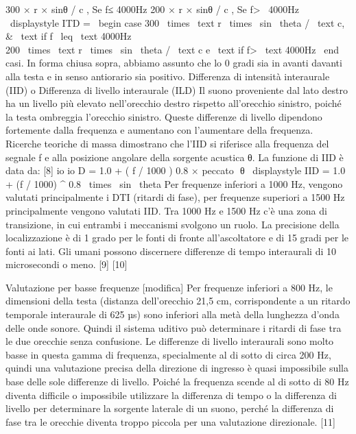 {
300 ×
r
× sin⁡θ
/
c
,
Se
f≤
4000Hz
200 ×
r
× sin⁡θ
/
c
,
Se
f>
 4000Hz
 
{\ displaystyle ITD = {\ begin {case} 300 \ times {\ text {r}} \ times \ sin \ theta / {\ text {c}}, & {\ text {if}} f \ leq {\ text {4000Hz}} \\ 200 \ times {\ text {r}} \ times \ sin \ theta / {\ text {c}} e {\ text {if}} f> {\ text {4000Hz}} \ end {casi}}}. In forma chiusa sopra, abbiamo assunto che lo 0 gradi sia in avanti davanti alla testa e in senso antiorario sia positivo.
Differenza di intensità interaurale (IID) o Differenza di livello interaurale (ILD) Il suono proveniente dal lato destro ha un livello più elevato nell'orecchio destro rispetto all'orecchio sinistro, poiché la testa ombreggia l'orecchio sinistro. Queste differenze di livello dipendono fortemente dalla frequenza e aumentano con l'aumentare della frequenza. Ricerche teoriche di massa dimostrano che l'IID si riferisce alla frequenza del segnale f e alla posizione angolare della sorgente acustica θ. La funzione di IID è data da: [8]
io
io
D
=
1.0
+
(
f
/
1000
)
0.8
×
peccato
⁡
θ
{\ displaystyle IID = 1.0 + (f / 1000) ^ {0.8} \ times \ sin \ theta}
Per frequenze inferiori a 1000 Hz, vengono valutati principalmente i DTI (ritardi di fase), per frequenze superiori a 1500 Hz principalmente vengono valutati IID. Tra 1000 Hz e 1500 Hz c'è una zona di transizione, in cui entrambi i meccanismi svolgono un ruolo.
La precisione della localizzazione è di 1 grado per le fonti di fronte all'ascoltatore e di 15 gradi per le fonti ai lati. Gli umani possono discernere differenze di tempo interaurali di 10 microsecondi o meno. [9] [10]

Valutazione per basse frequenze [modifica]
Per frequenze inferiori a 800 Hz, le dimensioni della testa (distanza dell'orecchio 21,5 cm, corrispondente a un ritardo temporale interaurale di 625 µs) sono inferiori alla metà della lunghezza d'onda delle onde sonore. Quindi il sistema uditivo può determinare i ritardi di fase tra le due orecchie senza confusione. Le differenze di livello interaurali sono molto basse in questa gamma di frequenza, specialmente al di sotto di circa 200 Hz, quindi una valutazione precisa della direzione di ingresso è quasi impossibile sulla base delle sole differenze di livello. Poiché la frequenza scende al di sotto di 80 Hz diventa difficile o impossibile utilizzare la differenza di tempo o la differenza di livello per determinare la sorgente laterale di un suono, perché la differenza di fase tra le orecchie diventa troppo piccola per una valutazione direzionale. [11]

}
